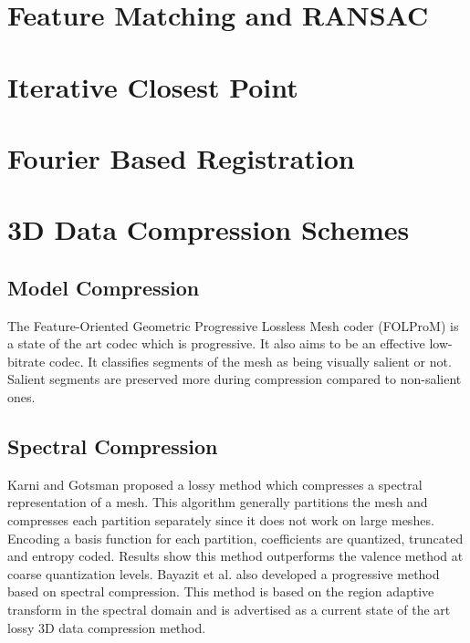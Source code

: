 \section{Feature Matching and RANSAC}

\section{Iterative Closest Point}

\section{Fourier Based Registration}

\section{3D Data Compression Schemes}

\subsection{Model Compression}

The Feature-Oriented Geometric Progressive Lossless Mesh coder (FOLProM) \cite{Peng10Feature} is a state of the art codec which is progressive. It also aims to be an effective low-bitrate codec. It classifies segments of the mesh as being visually salient or not. Salient segments are preserved more during compression compared to non-salient ones. \\

\subsection{Spectral Compression}

Karni and Gotsman \cite{Karni00Spectral} proposed a lossy method which compresses a spectral representation of a mesh. This algorithm generally partitions the mesh and compresses each partition separately since it does not work on large meshes. Encoding a basis function for each partition, coefficients are quantized, truncated and entropy coded. Results show this method outperforms the valence method \cite{touma98triangle} at coarse quantization levels. Bayazit et al. \cite{Bayazit103DMesh} also developed a progressive method based on spectral compression. This method is based on the region adaptive transform in the spectral domain and is advertised as a current state of the art lossy 3D data compression method. \\

